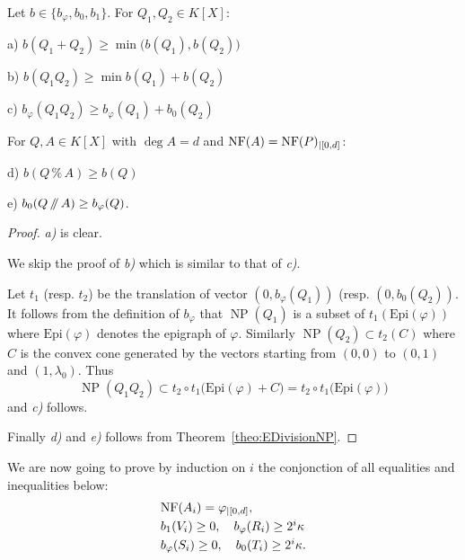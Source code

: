\documentclass{sig-alternate-05-2015}
\DeclareMathOperator{\NP}{NP}
\newcommand{\NF}{\text{\rm NF}}
\renewcommand{\mod}{\,\%\,}
\renewcommand{\div}{\,/\hspace{-0.3em}/\,}
\newcommand{\Epi}{\textrm{Epi}}
\begin{document}
\begin{lem}
\label{lem:bphib0}
Let $b \in \{b_\varphi, b_0, b_1\}$. For $Q_1, Q_2 \in K[X]$:

\smallskip

a) $b(Q_1+Q_2) \geq \min \big(b(Q_1), b(Q_2)\big)$

\smallskip

b) $b(Q_1Q_2) \geq \min b(Q_1) + b(Q_2)$ 

\smallskip

c) $b_\varphi(Q_1 Q_2) \geq b_\varphi(Q_1) + b_0(Q_2)$

\smallskip

\noindent
For $Q, A \in K[X]$ with $\deg A = d$ and $\NF(A) =
\NF(P)_{|[0,d]}$:

\smallskip

d) $b(Q \mod A) \geq b(Q)$

\smallskip

e) $b_0(Q \div A) \geq b_\varphi(Q)$.
\end{lem}

\begin{proof}
\emph{a)} is clear.

We skip the proof of \emph{b)} which is similar to that of \emph{c)}.

Let $t_1$ (resp. $t_2$) be the translation of vector $(0, b_\varphi
(Q_1))$ (resp. $(0, b_0(Q_2))$. It follows from the definition of
$b_\varphi$ that $\NP(Q_1)$ is a subset of $t_1(\Epi(\varphi))$ where
$\Epi(\varphi)$ denotes the epigraph of $\varphi$. Similarly $\NP(Q_2)
\subset t_2(C)$ where $C$ is the convex cone generated by the vectors 
starting from $(0,0)$ to $(0,1)$ and $(1, \lambda_0)$. Thus
$$\NP(Q_1 Q_2) \subset t_2 \circ t_1 \big(\Epi(\varphi) + C\big) =
t_2 \circ t_1\big(\Epi(\varphi)\big)$$
and \emph{c)} follows.

Finally \emph{d)} and \emph{e)} follows from
Theorem~\ref{theo:EDivisionNP}.
\end{proof}

We are now going to prove by induction on $i$ the conjonction of all
equalities and inequalities below:
\begin{equation}
\label{eq:induction}
\begin{array}{l}
\NF(A_i) = \varphi_{|[0,d]}, \smallskip \\
b_1(V_i) \geq 0, \quad
b_\varphi(R_i) \geq 2^i \kappa \smallskip \\
b_\varphi(S_i) \geq 0, \quad
b_0(T_i) \geq 2^i \kappa.
\end{array}
\end{equation}
\end{document}
